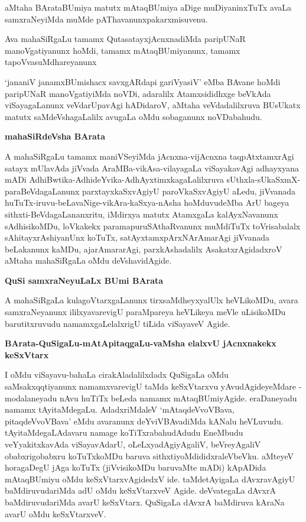 aMtaha BArataBUmiya matutx mAtaqBUmiya aDige muDiyaninxTuTx avaLa samxraNeyiMda muMde pAThavanunxpakarxmisuvenu.

Ava mahaSiRgaLu tamamx QutasatayxjAcnxnadiMda paripUNaR manoVgatiyanunx hoMdi, tamamx mAtaqBUmiyanunx, tamamx tapoVvasuMdhareyanunx 

`jananiV janamxBUmishacx savxgARdapi gariVyasiV'\label{103d} eMba BAvane hoMdi paripUNaR manoVgatiyiMda noVDi, adaralilx Atamxsididhxge beVkAda viSayagaLanunx veVdarUpavAgi hADidaroV, aMtaha veVdadalilxruva BUsUkatx matutx saMdeVshagaLalilx avugaLa oMdu sobaganunx noVDabahudu.

{\bigskip
\noindent
{\large\bf mahaSiRdeVsha BArata}}\label{page103a}
\medskip

\noindent
A mahaSiRgaLu tamamx maniVSeyiMda jAcnxna-vijAcnxna taqpAtxtamxrAgi satayx mUlavAda jiVvada AraMBa-vikAsa-vilayagaLa viSayakavAgi adhayxyana mADi AdhiBwtika-AdhideYvika-AdhAyxtimxkagaLalilxruva sUthxla-sUkaSxmX-paraBeVdagaLanunx parxtayxkaSxvAgiyU paroVkaSxvAgiyU aLedu, jiVvanada huTuTx-iruvu-beLavaNige-vikAra-kaSxya-nAsha hoMduvudeMba ArU bageya sithxti-BeVdagaLananxritu, iMdirxya matutx AtamxgaLa kalAyxNavanunx sAdhisikoMDu, loVkakekx paramapuruSAthaRvanunx muMdiTuTx toVrisabalalx sAhitayxrAshiyanUnx koTuTx, satAyxtamxpArxNArAmarAgi jiVvanada beLakanunx kaMDu, ajarAmararAgi, parxkAshadalilx AsakatxrAgidadxroV aMtaha mahaSiRgaLa oMdu deVshavidAgide.

\eject

{\bigskip
\noindent
{\large\bf QuSi samxraNeyuLaLx BUmi BArata}}\label{page104}
\medskip

\noindent
A mahaSiRgaLa kulagoVtarxgaLanunx tirxsaMdheyxyalUlx heVLikoMDu, avara samxraNeyanunx ililxyavarevigU paraMpareya heVLikeya meVle uLisikoMDu barutitxruvudu namamxgaLelalxrigU tiLida viSayaveV Agide.

{\bigskip
\noindent
{\large\bf BArata-QuSigaLu-mAtApitaqgaLu-vaMsha elalxvU jAcnxnakekx keSxVtarx}}\label{page104a}
\medskip

\noindent
I oMdu viSayavu-bahaLa cirakAladalilxdadx QuSigaLa oMdu saMsakxqqtiyanunx namamxvarevigU taMda keSxVtarxvu yAvudAgideyeMdare - modalaneyadu nAvu huTiTx beLeda namamx mAtaqBUmiyAgide. eraDaneyadu namamx tAyitaMdegaLu. AdadxriMdaleV `mAtaqdeVvoVBava, pitaqdeVvoVBava' eMdu avaranunx deYviVBAvadiMda kANalu heVLuvudu. tAyitaMdegaLAdavaru namage koTiTxrabahudAdudu EneMbudu veYyakitxkavAda viSayavAdarU, oLeLxyadAgiyAgaliV, beVreyAgaliV obabxrigobabxru koTuTxkoMDu baruva sithxtiyoMdididxraleVbeVku. aMteyeV horagaDegU jAga koTuTx (jiVvisikoMDu baruvaMte mADi) kApADida mAtaqBUmiyu oMdu keSxVtarxvAgidedxV ide. taMdetAyigaLa dAvxravAgiyU baMdiruvudariMda adU oMdu keSxVtarxveV Agide. deVvategaLa dAvxrA baMdiruvudariMda avarU keSxVtarx. QuSigaLa dAvxrA baMdiruva kAraNa avarU oMdu keSxVtarxveV.

